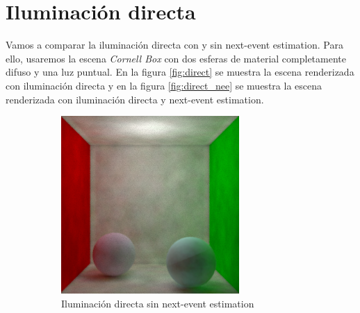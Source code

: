 \documentclass{article}
\begin{document}
\section{Iluminación directa}
Vamos a comparar la iluminación directa con y sin next-event estimation. Para
ello, usaremos la escena \textit{Cornell Box} con dos esferas de material
completamente difuso y una luz puntual. En la figura \ref{fig:direct} se muestra
la escena renderizada con iluminación directa y en la figura
\ref{fig:direct_nee} se muestra la escena renderizada con iluminación directa y
next-event estimation.

\begin{figure}
\begin{subfigure}[h]{0.4\linewidth}
\includegraphics[width=\linewidth]{imgs/pml.png}
\caption{Iluminación directa sin next-event estimation}
\end{subfigure}
\hfill
\begin{subfigure}[h]{0.4\linewidth}

\end{subfigure}
\end{figure}
\end{document}
